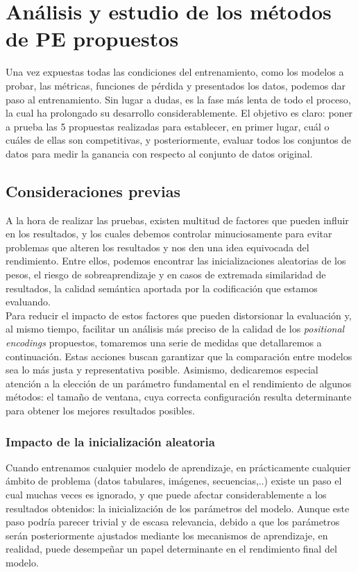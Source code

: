 \chapter{Análisis y estudio de los métodos de PE propuestos}

Una vez expuestas todas las condiciones del entrenamiento, como los modelos a probar, las métricas, funciones de pérdida y presentados los datos, podemos dar paso al entrenamiento. Sin lugar a dudas, es la fase más lenta de todo el proceso, la cual ha prolongado su desarrollo considerablemente. El objetivo es claro: poner a prueba las 5 propuestas realizadas para establecer, en primer lugar, cuál o cuáles de ellas son competitivas, y posteriormente, evaluar todos los conjuntos de datos para medir la ganancia con respecto al conjunto de datos original.

\section{Consideraciones previas}

A la hora de realizar las pruebas, existen multitud de factores que pueden influir en los resultados, y los cuales debemos controlar minuciosamente para evitar problemas que alteren los resultados y nos den una idea equivocada del rendimiento. Entre ellos, podemos encontrar las inicializaciones aleatorias de los pesos, el riesgo de sobreaprendizaje y en casos de extremada similaridad de resultados, la calidad semántica aportada por la codificación que estamos evaluando.\\

Para reducir el impacto de estos factores que pueden distorsionar la evaluación y, al mismo tiempo, facilitar un análisis más preciso de la calidad de los \textit{positional encodings} propuestos, tomaremos una serie de medidas que detallaremos a continuación. Estas acciones buscan garantizar que la comparación entre modelos sea lo más justa y representativa posible. Asimismo, dedicaremos especial atención a la elección de un parámetro fundamental en el rendimiento de algunos métodos: el tamaño de ventana, cuya correcta configuración resulta determinante para obtener los mejores resultados posibles.


\subsection{Impacto de la inicialización aleatoria}

Cuando entrenamos cualquier modelo de aprendizaje, en prácticamente cualquier ámbito de problema (datos tabulares, imágenes, secuencias,..) existe un paso el cual muchas veces es ignorado, y que puede afectar considerablemente a los resultados obtenidos: la inicialización de los parámetros del modelo. Aunque este paso podría parecer trivial y de escasa relevancia, debido a que los parámetros serán posteriormente ajustados mediante los mecanismos de aprendizaje, en realidad, puede desempeñar un papel determinante en el rendimiento final del modelo.\\

